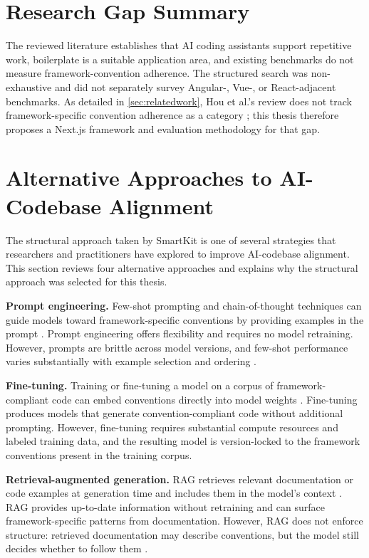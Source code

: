 \documentclass[12pt,a4paper]{report}
\begin{document}
\section{Research Gap Summary}

The reviewed literature establishes that AI coding assistants support repetitive work, boilerplate is a suitable application area, and existing benchmarks do not measure framework-convention adherence. The structured search was non-exhaustive and did not separately survey Angular-, Vue-, or React-adjacent benchmarks. As detailed in \autoref{sec:relatedwork}, Hou et al.'s review does not track framework-specific convention adherence as a category \parencite{hou2024llmse}; this thesis therefore proposes a Next.js framework and evaluation methodology for that gap.

\section{Alternative Approaches to AI-Codebase Alignment}

The structural approach taken by SmartKit is one of several strategies that researchers and practitioners have explored to improve AI-codebase alignment. This section reviews four alternative approaches and explains why the structural approach was selected for this thesis.

\textbf{Prompt engineering.} Few-shot prompting and chain-of-thought techniques can guide models toward framework-specific conventions by providing examples in the prompt \parencite{openai2024prompting,wei2022chain}. Prompt engineering offers flexibility and requires no model retraining. However, prompts are brittle across model versions, and few-shot performance varies substantially with example selection and ordering \parencite{brown2020language}.

\textbf{Fine-tuning.} Training or fine-tuning a model on a corpus of framework-compliant code can embed conventions directly into model weights \parencite{li2022codereviewer,roziere2023code}. Fine-tuning produces models that generate convention-compliant code without additional prompting. However, fine-tuning requires substantial compute resources and labeled training data, and the resulting model is version-locked to the framework conventions present in the training corpus.

\textbf{Retrieval-augmented generation.} RAG retrieves relevant documentation or code examples at generation time and includes them in the model's context \parencite{lewis2020retrieval,ram2023context}. RAG provides up-to-date information without retraining and can surface framework-specific patterns from documentation. However, RAG does not enforce structure: retrieved documentation may describe conventions, but the model still decides whether to follow them \parencite{shinn2024reflexion}.
\end{document}

